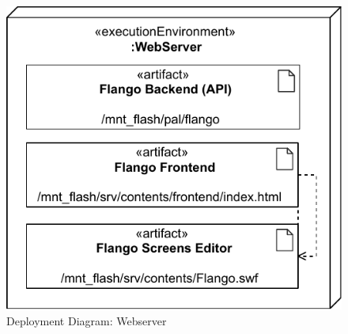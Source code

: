 \begin{figure}[htb]
    \centering
    \includegraphics{figures/design-deployment-webserver.pdf}
    \caption{Deployment Diagram: Webserver}
    \label{fig:deploy-webserver}
\end{figure}

\FloatBarrier
